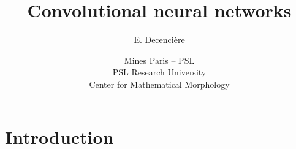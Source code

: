 \documentclass[xcolor=pdftex,dvipsnames,table,mathserif,aspectratio=169]{beamer}
\title{Convolutional neural networks}
\author{E. Decencière}
\date{Mines Paris -- PSL\\
  PSL Research University\\
  Center for Mathematical Morphology
}
\begin{document}
\begin{frame}
  \titlepage
\end{frame}






\section{Introduction}
\end{document}
